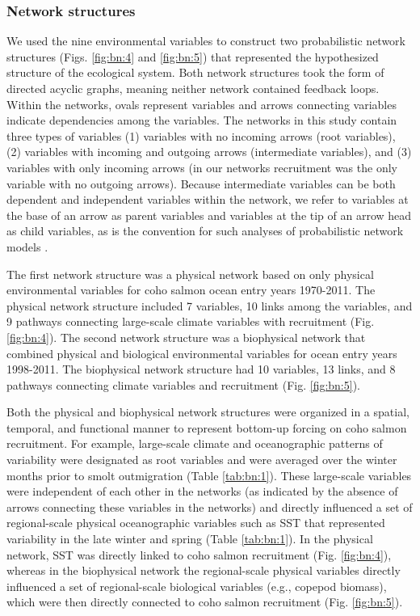 \subsubsection{Network structures}

We used the nine environmental variables to construct two probabilistic network
structures (Figs. \ref{fig:bn:4} and \ref{fig:bn:5}) that represented the
hypothesized structure of the ecological system. Both network structures took
the form of directed acyclic graphs, meaning neither network contained feedback
loops. Within the networks, ovals represent variables and arrows connecting
variables indicate dependencies among the variables.  The networks in this study
contain three types of variables (1) variables with no incoming arrows (root
variables), (2) variables with incoming and outgoing arrows (intermediate
variables), and (3) variables with only incoming arrows (in our networks
recruitment was the only variable with no outgoing arrows). Because intermediate
variables can be both dependent and independent variables within the network, we
refer to variables at the base of an arrow as parent variables and variables at
the tip of an arrow head as child variables, as is the convention for such
analyses of probabilistic network models \citep{Koller2009a, Korb2004a}.

The first network structure was a physical network based on only physical
environmental variables for coho salmon ocean entry years 1970-2011. The
physical network structure included 7 variables, 10 links among the variables,
and 9 pathways connecting large-scale climate variables with recruitment (Fig.
\ref{fig:bn:4}). The second network structure was a biophysical network that
combined physical and biological environmental variables for ocean entry years
1998-2011. The biophysical network structure had 10 variables, 13 links, and 8
pathways connecting climate variables and recruitment (Fig. \ref{fig:bn:5}).

Both the physical and biophysical network structures were organized in a
spatial, temporal, and functional manner to represent bottom-up forcing on coho
salmon recruitment. For example, large-scale climate and oceanographic patterns
of variability were designated as root variables and were averaged over the
winter months prior to smolt outmigration (Table \ref{tab:bn:1}). These
large-scale variables were independent of each other in the networks (as
indicated by the absence of arrows connecting these variables in the networks)
and directly influenced a set of regional-scale physical oceanographic variables
such as SST that represented variability in the late winter and spring (Table
\ref{tab:bn:1}). In the physical network, SST was directly linked to coho salmon
recruitment (Fig. \ref{fig:bn:4}), whereas in the biophysical network the
regional-scale physical variables directly influenced a set of regional-scale
biological variables (e.g., copepod biomass), which were then directly connected
to coho salmon recruitment (Fig. \ref{fig:bn:5}).


